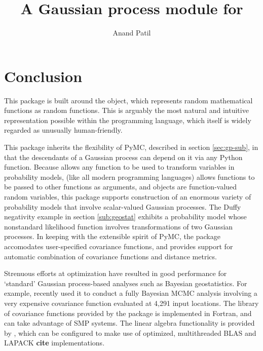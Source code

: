 \documentclass[article]{jss}
\author{Anand Patil}
\title{A Gaussian process module for \pkg{PyMC}}
\begin{document}
\maketitle

\tableofcontents

 

 


\section{Conclusion}

This package is built around the  object, which represents random mathematical functions as random  functions. This is arguably the most natural and intuitive representation possible within the  programming language, which itself is widely regarded as unusually human-friendly.

This package inherits the flexibility of PyMC, described in section \ref{sec:gp-sub}, in that the descendants of a Gaussian process can depend on it via any Python function. Because  allows any  function to be used to transform variables in probability models,  (like all modern programming languages) allows functions to be passed to other functions as arguments, and  objects are function-valued random variables, this package supports construction of an enormous variety of probability models that involve scalar-valued Gaussian processes. The Duffy negativity example in section \ref{sub:geostat} exhibits a probability model whose nonstandard likelihood function involves transformations of two Gaussian processes. In keeping with the extensible spirit of PyMC, the package accomodates user-specified covariance functions, and provides support for automatic combination of covariance functions and distance metrics.

Strenuous efforts at optimization have resulted in good performance for `standard' Gaussian process-based analyses such as Bayesian geostatistics. For example, \cite{map} recently used it to conduct a fully Bayesian MCMC analysis involving a very expensive covariance function evaluated at 4,291 input locations. The library of covariance functions provided by the package is implemented in Fortran, and can take advantage of SMP systems. The linear algebra functionality is provided by , which can be configured to make use of optimized, multithreaded BLAS and LAPACK \textbf{cite} implementations. 
\end{document}
